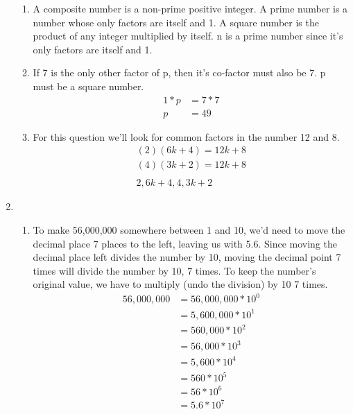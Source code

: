 \documentclass[11pt]{article}
\begin{document}
\begin{enumerate}
\begin{enumerate}
            \item
                A composite number is a non-prime positive integer.
                A prime number is a number whose only factors are itself and 1.
                A square number is the product of any integer multiplied by itself.
                n is a prime number since it's only factors are itself and 1.
            
            \item If 7 is the only other factor of p, then it's co-factor must also be 7. p must be a square number.
                \begin{equation*}
                    \begin{split}
                    1*p&=7*7\\
                    p&=49
                    \end{split}
                \end{equation*}
                
            \item For this question we'll look for common factors in the number 12 and 8.
                \begin{equation*}
                    \begin{split}
                        (2)(6k+4)=12k+8\\
                        (4)(3k+2)=12k+8\\
                        \\
                        2, 6k+4, 4, 3k+2
                    \end{split}
                \end{equation*}
        \end{enumerate}
    
    \pagebreak
    \item
        \begin{enumerate}
            \item To make 56,000,000 somewhere between 1 and 10, we'd need to move the decimal place 7 places to the left, leaving us with 5.6.
            Since moving the decimal place left divides the number by 10, moving the decimal point 7 times will divide the number by 10, 7 times. To keep the number's original value, we have to multiply (undo the division) by 10 7 times.
            \begin{equation*}
                \begin{split}
                56,000,000&=56,000,000*10^0\\
                &=5,600,000*10^1\\
                &=560,000*10^2\\
                &=56,000*10^3\\
                &=5,600*10^4\\
                &=560*10^5\\
                &=56*10^6\\
                &=5.6*10^7
                \end{split}
            \end{equation*}
            

\end{enumerate}
\end{enumerate}
\end{document}
